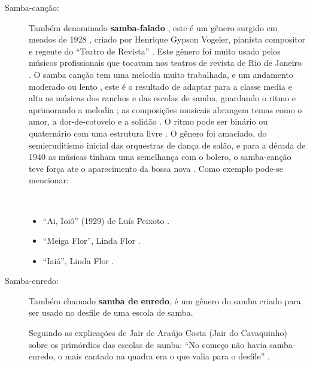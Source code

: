 \begin{description}
\item[Samba-canção:] 
Também denominado \textbf{samba-falado} \cite[pp. 63]{reinato2010musica},
este é um gênero surgido em meados de 1928 \cite[pp. 63]{reinato2010musica} \cite[pp. 291]{dourado2004dicionario},
criado por Henrique Gypson Vogeler, pianista compositor e regente do ``Teatro de Revista'' \cite[pp. 63]{reinato2010musica}. 
Este gênero foi muito usado pelos músicos profissionais que tocavam nos teatros de revista de Rio de Janeiro \cite[pp. 291]{dourado2004dicionario}.
O samba canção tem uma melodia muito trabalhada, e um andamento moderado \cite[pp. 291]{dourado2004dicionario} ou lento \cite[pp. 63]{reinato2010musica}, 
este é o resultado de adaptar para a classe media e alta as músicas dos ranchos e das escolas de samba, 
guardando o ritmo e aprimorando a melodia \cite[pp. 4]{musicasambavariasdef1} \cite[pp. 128]{perna2002samba}; 
as composições musicais abrangem temas como o amor, a dor-de-cotovelo e a solidão \cite[pp. 291]{dourado2004dicionario}.
O ritmo pode ser binário ou quaternário com uma estrutura livre \cite[pp. 63]{reinato2010musica}.
O gênero foi amaciado, do semieruditismo inicial das orquestras de dança de salão, 
e para a década de 1940 as músicas tinham uma semelhança com o bolero,
o samba-canção teve força ate o aparecimento da bossa nova \cite[pp. 128]{perna2002samba}.
Como exemplo pode-se mencionar: 
\begin{example} ~

\begin{itemize}
\item ``Ai, Ioiô'' (1929) de Luís Peixoto  \cite[pp. 128]{perna2002samba} \cite[pp. 291]{dourado2004dicionario}.
\item ``Meiga Flor'', Linda Flor \cite[pp. 63]{reinato2010musica}.
\item ``Iaiá'', Linda Flor \cite[pp. 63]{reinato2010musica}.
\end{itemize}
\end{example}


\item[Samba-enredo:] 
Também chamado \textbf{samba de enredo}, é um gênero do samba criado para ser usado no desfile de uma escola de samba.

Seguindo as explicações de Jair de Araújo Costa (Jair do Cavaquinho) sobre os primórdios das escolas de samba: 
``No começo não havia samba-enredo, o mais cantado na quadra era o que valia para o desfile'' \cite[pp. 85]{de2003tem}.



\end{description}
